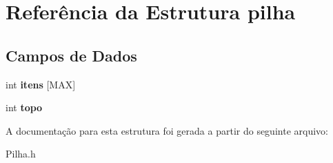 \hypertarget{structpilha}{\section{Referência da Estrutura pilha}
\label{structpilha}
}
\subsection*{Campos de Dados}
\begin{DoxyCompactItemize}
\item 
\hypertarget{structpilha_ab16d471b0fdac74fc6e27bb355ea9072}{int {\bfseries itens} \mbox{[}M\+A\+X\mbox{]}}\label{structpilha_ab16d471b0fdac74fc6e27bb355ea9072}

\item 
\hypertarget{structpilha_a0659489fdf831898ed7b9cf316040abd}{int {\bfseries topo}}\label{structpilha_a0659489fdf831898ed7b9cf316040abd}

\end{DoxyCompactItemize}


A documentação para esta estrutura foi gerada a partir do seguinte arquivo\+:\begin{DoxyCompactItemize}
\item 
Pilha.\+h\end{DoxyCompactItemize}

